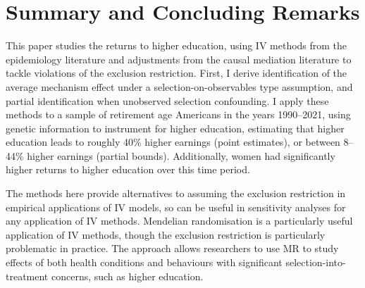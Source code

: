 \section{Summary and Concluding Remarks}
\label{sec:conclusion}

This paper studies the returns to higher education, using IV methods from the epidemiology literature and adjustments from the causal mediation literature to tackle violations of the exclusion restriction.
First, I derive identification of the average mechanism effect under a selection-on-observables type assumption, and partial identification when unobserved selection confounding.
I apply these methods to a sample of retirement age Americans in the years 1990--2021, using genetic information to instrument for higher education, estimating that higher education leads to roughly 40\% higher earnings (point estimates), or between 8--44\% higher earnings (partial bounds).
Additionally, women had significantly higher returns to higher education over this time period.

The methods here provide alternatives to assuming the exclusion restriction in empirical applications of IV models, so can be useful in sensitivity analyses for any application of IV methods.
Mendelian randomisation is a particularly useful application of IV methods, though the exclusion restriction is particularly problematic in practice.
The approach allows researchers to use MR to study effects of both health conditions and behaviours with significant selection-into-treatment concerns, such as higher education.
